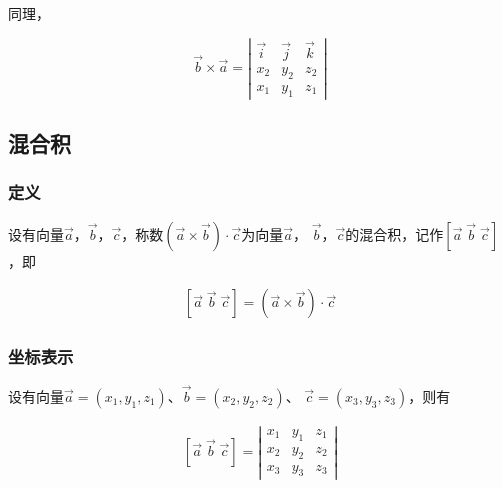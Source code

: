 \documentclass[
	11pt, %
	a4paper, %
]{WhuSakuraBook}
\begin{document}
    同理，

    \[
        \overrightarrow{b} \times \overrightarrow{a} =
        \left|
            \begin{array}{cccc}
            \overrightarrow{i} & \overrightarrow{j} & \overrightarrow{k} \\
            x_2 & y_2 & z_2 \\
            x_1 & y_1 & z_1
            \end{array}
        \right|
    \]

\subsection{混合积}

\subsubsection*{定义}

    设有向量\(\overrightarrow{a}\)，\(\overrightarrow{b}\)，\(\overrightarrow{c}\)，称数\(\left(\overrightarrow{a}
    \times \overrightarrow{b}\right) \cdot \overrightarrow{c}\)为向量\(\overrightarrow{a}\)，
	\(\overrightarrow{b}\)，\(\overrightarrow{c}\)的混合积，记作\(\left[\overrightarrow{a} \; \overrightarrow{b} \;
    \overrightarrow{c}\right]\)，即

    \begin{align}
        \left[\overrightarrow{a} \; \overrightarrow{b} \; \overrightarrow{c}\right] =
        \left(\overrightarrow{a} \times \overrightarrow{b}\right) \cdot \overrightarrow{c}
    \end{align}

\subsubsection*{坐标表示}

    设有向量\(\overrightarrow{a} = \left(x_1, y_1, z_1\right)\)、\(\overrightarrow{b} = \left(x_2, y_2, z_2\right)\)、
    \(\overrightarrow{c} = \left(x_3, y_3, z_3\right)\)，则有

    \begin{align}
        \left[\overrightarrow{a} \; \overrightarrow{b} \; \overrightarrow{c}\right] =
        \left|
            \begin{array}{cccc}
            x_1 & y_1 & z_1 \\
            x_2 & y_2 & z_2 \\
            x_3 & y_3 & z_3
            \end{array}
        \right|
    \end{align}
\end{document}
